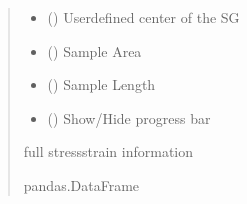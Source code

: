 \documentclass[letterpaper,10pt,english]{sphinxmanual}
\begin{document}
\begin{fulllineitems}
\begin{fulllineitems}
\begin{quote}
\begin{description}
\begin{itemize}
\item {} 
\sphinxAtStartPar
{} (\sphinxstyleliteralemphasis{\sphinxupquote{{[}}}\sphinxstyleliteralemphasis{\sphinxupquote{, }}\sphinxstyleliteralemphasis{\sphinxupquote{, }}\sphinxstyleliteralemphasis{\sphinxupquote{{]}}}) \textendash{} User\sphinxhyphen{}defined center of the SG

\item {} 
\sphinxAtStartPar
{} () \textendash{} Sample Area

\item {} 
\sphinxAtStartPar
{} () \textendash{} Sample Length

\item {} 
\sphinxAtStartPar
{} () \textendash{} Show/Hide progress bar

\end{itemize}

\sphinxAtStartPar
full stress\sphinxhyphen{}strain information

\sphinxAtStartPar
pandas.DataFrame


\end{description}
\end{quote}
\end{fulllineitems}
\end{fulllineitems}
\end{document}
